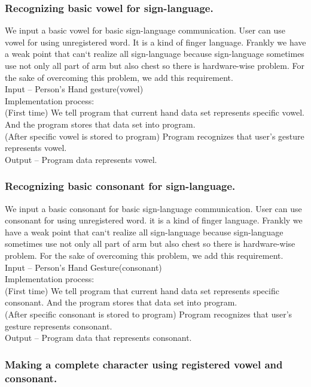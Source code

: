 \documentclass[10pt,journal,compsoc]{IEEEtran}
\begin{document}
\subsubsection{Recognizing basic vowel for sign-language.}

We input a basic vowel for basic sign-language communication. User can use vowel for using unregistered word. It is a kind of finger language. Frankly we have a weak point that can`t realize all sign-language because sign-language sometimes use not only all part of arm but also chest so there is hardware-wise problem. For the sake of overcoming this problem, we add this requirement.
\\Input – Person's Hand gesture(vowel)
\\Implementation process:
\\(First time) We tell program that current hand data set represents specific vowel. And the program stores that data set into program.
\\(After specific vowel is stored to program) Program recognizes that user’s gesture represents vowel.
\\Output – Program data represents vowel.

\subsubsection{Recognizing basic consonant for sign-language.}

We input a basic consonant for basic sign-language communication. User can use consonant for using unregistered word. it is a kind of finger language. Frankly we have a weak point that can`t realize all sign-language because sign-language sometimes use not only all part of arm but also chest so there is hardware-wise problem. For the sake of overcoming this problem, we add this requirement.
\\Input – Person's Hand Gesture(consonant)
\\Implementation process:
\\(First time) We tell program that current hand data set represents specific consonant. And the program stores that data set into program.
\\(After specific consonant is stored to program) Program recognizes that user’s gesture represents consonant.
\\Output – Program data that represents consonant.

\subsubsection{Making a complete character using registered vowel and consonant.}
\end{document}
